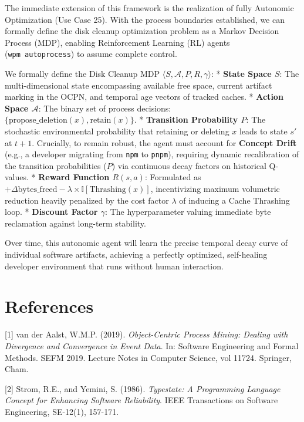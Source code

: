 \documentclass[
  12pt,
]{report}
\begin{document}
The immediate extension of this framework is the realization of fully
Autonomic Optimization (Use Case 25). With the process boundaries
established, we can formally define the disk cleanup optimization
problem as a Markov Decision Process (MDP), enabling Reinforcement
Learning (RL) agents (\texttt{wpm\ autoprocess}) to assume complete
control.

We formally define the Disk Cleanup MDP
\(\langle S, \mathcal{A}, P, R, \gamma \rangle\): * \textbf{State Space
\(S\)}: The multi-dimensional state encompassing available free space,
current artifact marking in the OCPN, and temporal age vectors of
tracked caches. * \textbf{Action Space \(\mathcal{A}\)}: The binary set
of process decisions:
\(\{ \text{propose\_deletion}(x), \text{retain}(x) \}\). *
\textbf{Transition Probability \(P\)}: The stochastic environmental
probability that retaining or deleting \(x\) leads to state \(s'\) at
\(t+1\). Crucially, to remain robust, the agent must account for
\textbf{Concept Drift} (e.g., a developer migrating from \texttt{npm} to
\texttt{pnpm}), requiring dynamic recalibration of the transition
probabilities (\(P\)) via continuous decay factors on historical
Q-values. * \textbf{Reward Function \(R(s, a)\)}: Formulated as
\(+\Delta \text{bytes\_freed} - \lambda \times \mathbb{I}[\text{Thrashing}(x)]\),
incentivizing maximum volumetric reduction heavily penalized by the cost
factor \(\lambda\) of inducing a Cache Thrashing loop. *
\textbf{Discount Factor \(\gamma\)}: The hyperparameter valuing
immediate byte reclamation against long-term stability.

Over time, this autonomic agent will learn the precise temporal decay
curve of individual software artifacts, achieving a perfectly optimized,
self-healing developer environment that runs without human interaction.

\chapter{References}\label{references}

{[}1{]} van der Aalst, W.M.P. (2019). \emph{Object-Centric Process
Mining: Dealing with Divergence and Convergence in Event Data}. In:
Software Engineering and Formal Methods. SEFM 2019. Lecture Notes in
Computer Science, vol 11724. Springer, Cham.

{[}2{]} Strom, R.E., and Yemini, S. (1986). \emph{Typestate: A
Programming Language Concept for Enhancing Software Reliability}. IEEE
Transactions on Software Engineering, SE-12(1), 157-171.
\end{document}
